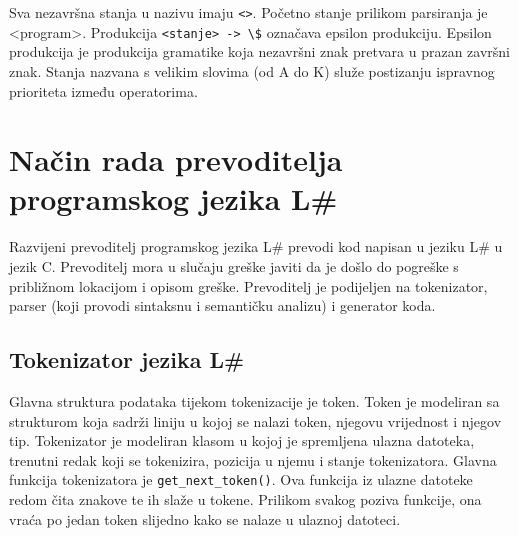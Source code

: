 \documentclass[times, utf8, zavrsni]{fer}
\begin{document}
Sva nezavršna stanja u nazivu imaju \verb|<>|. Početno stanje prilikom parsiranja je <program>. Produkcija \verb|<stanje> -> \$|
označava epsilon produkciju. Epsilon produkcija je produkcija gramatike koja nezavršni znak pretvara u prazan završni znak. \citep{ppj}
Stanja nazvana s velikim slovima (od A do K) služe postizanju ispravnog prioriteta 
između operatorima.

\chapter{Način rada prevoditelja programskog jezika L\#}
Razvijeni prevoditelj programskog jezika L\# prevodi kod napisan u jeziku L\# u jezik C. Prevoditelj
mora u slučaju greške javiti da je došlo do pogreške s približnom lokacijom i opisom greške. Prevoditelj
je podijeljen na tokenizator, parser (koji provodi sintaksnu i semantičku analizu) i generator koda.

\section{Tokenizator jezika L\#}
Glavna struktura podataka tijekom tokenizacije je token. Token je modeliran sa strukturom koja sadrži liniju u kojoj se nalazi token,
njegovu vrijednost i njegov tip. Tokenizator je modeliran klasom u kojoj je spremljena ulazna datoteka, trenutni redak koji se tokenizira, pozicija u njemu 
i stanje tokenizatora. Glavna funkcija tokenizatora je \verb|get_next_token()|. Ova funkcija iz
ulazne datoteke redom čita znakove te ih slaže u tokene. Prilikom svakog poziva funkcije, ona vraća po jedan token
slijedno kako se nalaze u ulaznoj datoteci.
\end{document}
